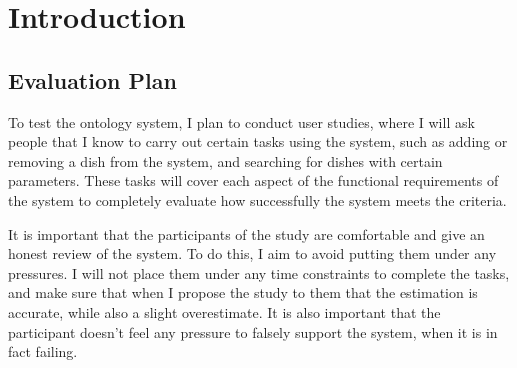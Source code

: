 \chapter{Introduction}

\section{Evaluation Plan}

To test the ontology system, I plan to conduct user studies, where I will ask people that I know to carry out certain tasks using the system, such as adding or removing a dish from the system, and searching for dishes with certain parameters. These tasks will cover each aspect of the functional requirements of the system to completely evaluate how successfully the system meets the criteria.

It is important that the participants of the study are comfortable and give an honest review of the system. To do this, I aim to avoid putting them under any pressures. I will not place them under any time constraints to complete the tasks, and make sure that when I propose the study to them that the estimation is accurate, while also a slight overestimate. It is also important that the participant doesn't feel any pressure to falsely support the system, when it is in fact failing.


